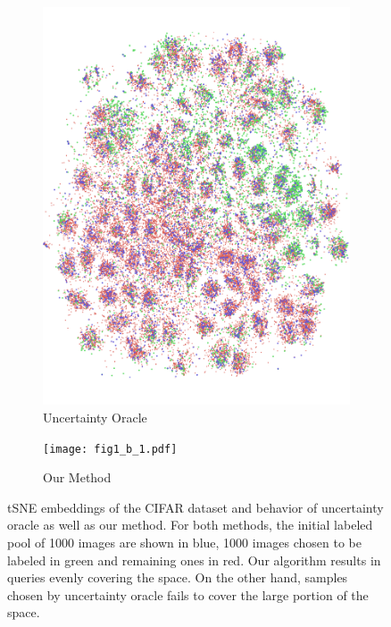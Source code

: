 \documentclass{article} %
\begin{document}
\begin{figure}[tb]
    \begin{minipage}[t]{0.49\textwidth}
  \begin{center}
    \begin{subfigure}[b]{0.49\textwidth}
		\includegraphics[width=\columnwidth]{fig1_a_1.pdf}
		\caption{Uncertainty Oracle}
    \end{subfigure}
    \begin{subfigure}[b]{0.49\textwidth}
		\texttt{[image: fig1\_b\_1.pdf]}
		\caption{Our Method}
    \end{subfigure}
\end{center}
 \caption{tSNE embeddings of the CIFAR dataset and behavior of uncertainty oracle as well as our method. For both methods, the initial labeled pool of 1000 images are shown in blue, 1000 images chosen to be labeled in green and remaining ones in red. Our algorithm results in queries evenly covering the space. On the other hand, samples chosen by uncertainty oracle fails to cover the large portion of the space.}

\end{minipage}
\end{figure}
\end{document}
